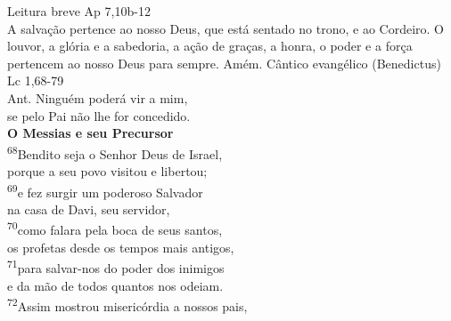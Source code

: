 \documentclass{book}
\begin{document}
\begin{center}
    \textcolor{VioletRed2}{Leitura breve Ap 7,10b-12}
    \vspace{.2cm} \\
    A salvação pertence ao nosso Deus, que está sentado no trono, e ao Cordeiro. O louvor, a glória e a sabedoria, a ação de graças, a honra, o poder e a força pertencem ao nosso Deus para sempre. Amém.
    \newpage
    \textcolor{VioletRed2}{Cântico evangélico (Benedictus) \\ Lc 1,68-79}
    \vspace{.2cm} \\
    \textcolor{VioletRed2}{Ant.} Ninguém poderá vir a mim, \\
    se pelo Pai não lhe for concedido.
    \vspace{.2cm} \\
    \textbf{O Messias e seu Precursor}
    \vspace{.2cm} \\
    \textsuperscript{\underline{\hspace{.06in}}\textcolor{VioletRed2}{68}}Bendito seja o Senhor Deus de Israel, \textsuperscript{\gresixstar{}} \\
    porque a seu povo visitou e libertou;
    \vspace{.2cm} \\
    \textsuperscript{\underline{\hspace{.06in}}\textcolor{VioletRed2}{69}}e fez surgir um poderoso Salvador \textsuperscript{\gresixstar{}} \\
    na casa de Davi, seu servidor,
    \vspace{.2cm} \\
    \textsuperscript{\underline{\hspace{.06in}}\textcolor{VioletRed2}{70}}como falara pela boca de seus santos, \textsuperscript{\gresixstar{}} \\
    os profetas desde os tempos mais antigos,
    \vspace{.2cm} \\
    \textsuperscript{\underline{\hspace{.06in}}\textcolor{VioletRed2}{71}}para salvar-nos do poder dos inimigos \textsuperscript{\gresixstar{}} \\
    e da mão de todos quantos nos odeiam.
    \vspace{.2cm} \\
    \textsuperscript{\underline{\hspace{.06in}}\textcolor{VioletRed2}{72}}Assim mostrou misericórdia a nossos pais, \textsuperscript{\gresixstar{}} \\

\end{center}
\end{document}
